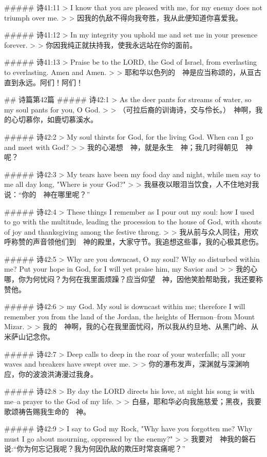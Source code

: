##### 诗41:11
> I know that you are pleased with me, for my enemy does not triumph over me.
>
> 因我的仇敌不得向我夸胜，我从此便知道你喜爱我。


##### 诗41:12
> In my integrity you uphold me and set me in your presence forever.
>
> 你因我纯正就扶持我，使我永远站在你的面前。


##### 诗41:13
> Praise be to the LORD, the God of Israel, from everlasting to everlasting. Amen and Amen.
>
> 耶和华以色列的　神是应当称颂的，从亘古直到永远。阿们！阿们！


## 诗篇第42篇
##### 诗42:1
> As the deer pants for streams of water, so my soul pants for you, O God.
>
> （可拉后裔的训诲诗，交与伶长。）　神啊，我的心切慕你，如鹿切慕溪水。


##### 诗42:2
> My soul thirsts for God, for the living God. When can I go and meet with God?
>
> 我的心渴想　神，就是永生　神；我几时得朝见　神呢？


##### 诗42:3
> My tears have been my food day and night, while men say to me all day long, "Where is your God?"
>
> 我昼夜以眼泪当饮食，人不住地对我说：“你的　神在哪里呢？”


##### 诗42:4
> These things I remember as I pour out my soul: how I used to go with the multitude, leading the procession to the house of God, with shouts of joy and thanksgiving among the festive throng.
>
> 我从前与众人同往，用欢呼称赞的声音领他们到　神的殿里，大家守节。我追想这些事，我的心极其悲伤。


##### 诗42:5
> Why are you downcast, O my soul? Why so disturbed within me? Put your hope in God, for I will yet praise him, my Savior and
>
> 我的心哪，你为何忧闷？为何在我里面烦躁？应当仰望　神，因他笑脸帮助我，我还要称赞他。


##### 诗42:6
> my God. My soul is downcast within me; therefore I will remember you from the land of the Jordan, the heights of Hermon--from Mount Mizar.
>
> 我的　神啊，我的心在我里面忧闷，所以我从约旦地、从黑门岭、从米萨山记念你。


##### 诗42:7
> Deep calls to deep in the roar of your waterfalls; all your waves and breakers have swept over me.
>
> 你的瀑布发声，深渊就与深渊响应，你的波浪洪涛漫过我身。


##### 诗42:8
> By day the LORD directs his love, at night his song is with me--a prayer to the God of my life.
>
> 白昼，耶和华必向我施慈爱；黑夜，我要歌颂祷告赐我生命的　神。


##### 诗42:9
> I say to God my Rock, "Why have you forgotten me? Why must I go about mourning, oppressed by the enemy?"
>
> 我要对　神我的磐石说:“你为何忘记我呢？我为何因仇敌的欺压时常哀痛呢？”


